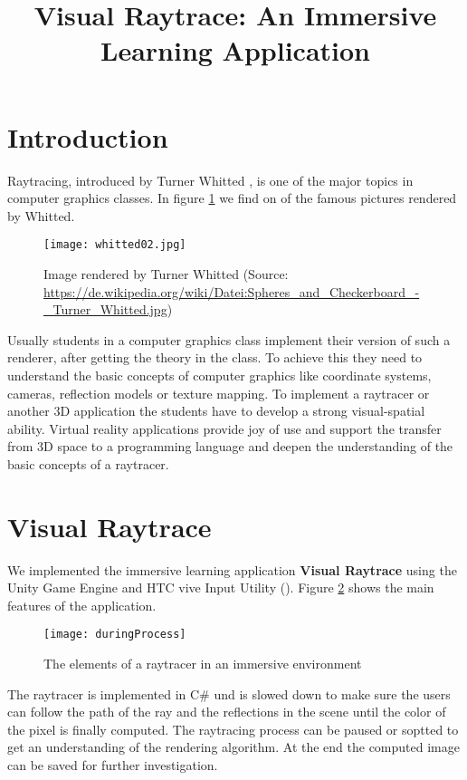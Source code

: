 \documentclass{VRARWorkshop}
\title{Visual Raytrace: An Immersive Learning Application}
\begin{document}

\section{Introduction}
Raytracing, introduced by Turner Whitted \cite{whitted_80}, is one of the major topics in
computer graphics classes.
In figure \ref{intro:whitted} we find on of the famous pictures rendered by Whitted.

\begin{figure}[h!]
    \begin{center}
        \texttt{[image: whitted02.jpg]}
        \caption{\label{intro:whitted} Image rendered by Turner Whitted (Source:
        \url{https://de.wikipedia.org/wiki/Datei:Spheres_and_Checkerboard_-_Turner_Whitted.jpg})}
    \end{center}
\end{figure}
Usually students in a computer graphics class implement their version of such a renderer,
after getting the theory in the class.
To achieve this they need to understand the basic concepts of computer graphics like coordinate systems,
cameras, reflection models or texture mapping. To implement a raytracer or another 3D application the students have to
develop a strong visual-spatial ability. Virtual reality applications provide joy of use and support the transfer
from 3D space to a programming language and deepen the understanding of the basic concepts of a raytracer.
%
\section{Visual Raytrace}
We implemented the immersive learning application \textbf{Visual Raytrace} \cite{saerota_21b, visualraytrace} using the Unity Game Engine
and HTC vive Input Utility (\cite{viveInput}). Figure \ref{vray:scene} shows the main features of the application.

\begin{figure}[h!]
    \begin{center}
        \texttt{[image: duringProcess]}
        \caption{\label{vray:scene} The elements of a raytracer in an immersive environment}
    \end{center}
\end{figure}
The raytracer is implemented in C\# und is slowed down to make sure the users can follow the path
of the ray and the reflections in the scene until the color of the pixel is finally computed.
The raytracing process can be paused or soptted to get an understanding of the rendering algorithm.
At the end the computed image can be saved for further investigation.
\end{document}
